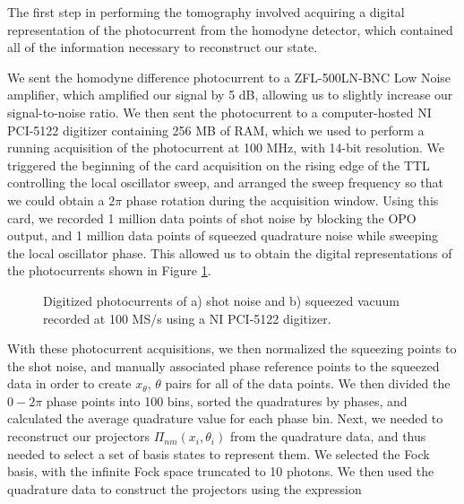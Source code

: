  The first step in performing the tomography involved acquiring a digital representation of the photocurrent from the homodyne detector, which contained all of the information necessary to reconstruct our state.

We sent the homodyne difference photocurrent to a ZFL-500LN-BNC Low Noise amplifier, which amplified our signal by 5 dB, allowing us to slightly increase our signal-to-noise ratio.  We then sent the photocurrent to a computer-hosted NI PCI-5122 digitizer containing 256 MB of RAM, which we used to perform a running acquisition of the photocurrent at 100 MHz, with 14-bit resolution.  We triggered the beginning of the card acquisition on the rising edge of the TTL controlling the local oscillator sweep, and arranged the sweep frequency so that we could obtain a $2\pi$ phase rotation during the acquisition window.  Using this card, we recorded 1 million data points of shot noise by blocking the OPO output, and 1 million data points of squeezed quadrature noise while sweeping the local oscillator phase.  This allowed us to obtain the digital representations of the photocurrents shown in Figure \ref{fig:dig_noise}.

\begin{figure}[!ht]
  \centering
  
  \caption[Digitized photocurrents of shot noise and vacuum squeezing]{Digitized photocurrents of a) shot noise and b) squeezed vacuum recorded at 100 MS/s using a NI PCI-5122 digitizer.}
  \label{fig:dig_noise}
\end{figure}

With these photocurrent acquisitions, we then normalized the squeezing points to the shot noise, and manually associated phase reference points to the squeezed data in order to create $x_\theta$, $\theta $ pairs for all of the data points.  We then divided the $0-2\pi$ phase points into 100 bins, sorted the quadratures by phases, and calculated the average quadrature value for each phase bin.  Next, we needed to reconstruct our projectors $\Pi_{nm}(x_i, \theta_i )$ from the quadrature data, and thus needed to select a set of basis states to represent them.  We selected the Fock basis, with the infinite Fock space truncated to 10 photons.  We then used the quadrature data to construct the projectors using the expression \cite{lvovsky2004}

